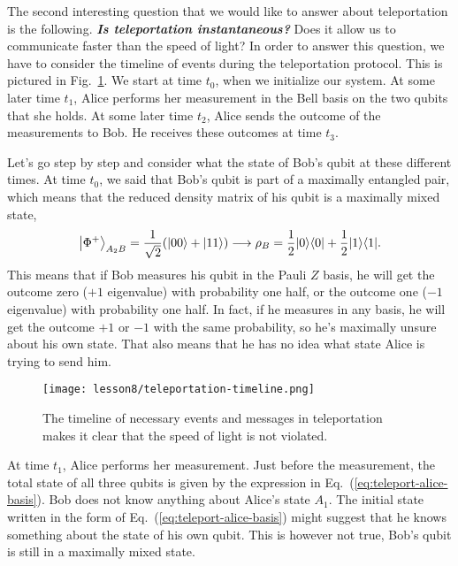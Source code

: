 The second interesting question that we would like to answer about teleportation is the following.
\textbf{\emph{Is teleportation instantaneous?}}
Does it allow us to communicate faster than the speed of light?
In order to answer this question, we have to consider the timeline of events during the teleportation protocol.
This is pictured in Fig.~\ref{fig:teleportation-timeline}.
We start at time $t_0$, when we initialize our system.
At some later time $t_1$, Alice performs her measurement in the Bell basis on the two qubits that she holds.
At some later time $t_2$, Alice sends the outcome of the measurements to Bob.
He receives these outcomes at time $t_3$.

Let's go step by step and consider what the state of Bob's qubit at these different times.
At time $t_0$, we said that Bob's qubit is part of a maximally entangled pair, which means that the reduced density matrix of his qubit is a maximally mixed state,
\begin{equation}
    \left|\Phi^{+}\right\rangle_{A_2 B}=\frac{1}{\sqrt{2}}(|00\rangle+|11\rangle) \longrightarrow \rho_B=\frac{1}{2}|0 \rangle \langle 0| +\frac{1}{2}|1 \rangle \langle 1|.
\end{equation}
This means that if Bob measures his qubit in the Pauli $Z$ basis, he will get the outcome zero ($+1$ eigenvalue) with probability one half, or the outcome one ($-1$ eigenvalue) with probability one half. In fact, if he measures in any basis, he will get the outcome $+1$ or $-1$ with the same probability, so he's maximally unsure about his own state. That also means that he has no idea what state Alice is trying to send him.
\begin{figure}[H]
    \centering
    \texttt{[image: lesson8/teleportation-timeline.png]}
        \caption[Event timing in teleportation.]{The timeline of necessary events and messages in teleportation makes it clear that the speed of light is not violated.}
    \label{fig:teleportation-timeline}
\end{figure}

At time $t_1$, Alice performs her measurement.
Just before the measurement, the total state of all three qubits is given by the expression in Eq.~(\ref{eq:teleport-alice-basis}).
Bob does not know anything about Alice's state $A_1$.
The initial state written in the form of Eq.~(\ref{eq:teleport-alice-basis}) might suggest that he knows something about the state of his own qubit.
This is however not true, Bob's qubit is still in a maximally mixed state.

